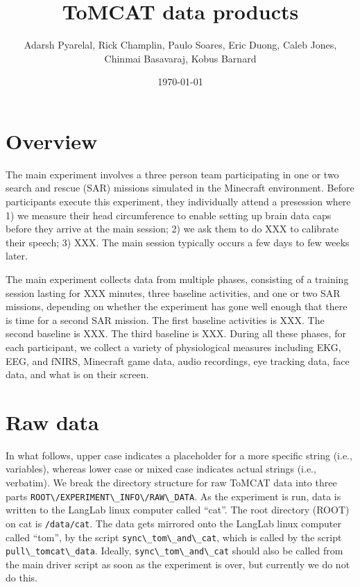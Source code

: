 \documentclass[12pt,letterpaper,oneside,openany]{article}
\title{ToMCAT data products}
\author{Adarsh Pyarelal, Rick Champlin, Paulo Soares, Eric Duong, Caleb
Jones, Chinmai Basavaraj, Kobus Barnard}
\date{\today}
\newcommand{\code}[1]{\lstinline{#1}}
\begin{document}
\maketitle
\setcounter{page}{2}

\section{Overview}

The main experiment involves a three person team participating in one or two
search and rescue (SAR) missions simulated in the Minecraft environment. 
Before participants execute this experiment, they individually attend a
presession where 1) we measure their head circumference to enable setting up brain data caps
before they arrive at the main session; 2) we ask them to do XXX to calibrate
their speech; 3) XXX. The main session typically occurs a few days to few weeks
later. 

The main experiment collects data from multiple phases, consisting of a training
session lasting for XXX minutes, three baseline activities, and one or two SAR
missions, depending on whether the experiment has gone well enough that there is
time for a second SAR mission.  The first baseline activities is XXX. The second
baseline is XXX.  The third baseline is XXX.  During all these phases, for each
participant, we collect a variety of physiological measures including EKG, EEG,
and fNIRS, Minecraft game data, audio recordings, eye tracking data, face data,
and what is on their screen. 

\section{Raw data}

In what follows, upper case indicates
a placeholder for a more specific string (i.e., variables), whereas lower case or mixed case
indicates actual strings (i.e., verbatim).
We break the directory structure for raw ToMCAT data into three parts
\code{ROOT\/EXPERIMENT\_INFO\/RAW\_DATA}. 
As the experiment is run, data is written to the LangLab linux computer called
``cat''. The root directory (ROOT) on cat is
\code{/data/cat}. The data gets mirrored onto the LangLab linux computer called
``tom'', by the script \code{sync\_tom\_and\_cat}, which is called by the script 
\code{pull\_tomcat\_data}. Ideally, \code{sync\_tom\_and\_cat} should also be
called from the main driver script as soon as the experiment is over, but
currently we do not do this. 
\end{document}
